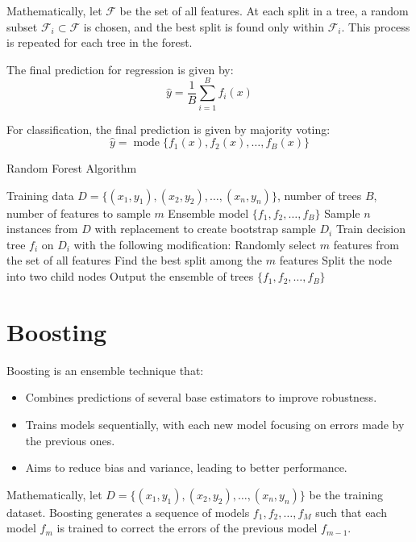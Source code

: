 \documentclass[12pt]{article}
\begin{document}
Mathematically, let \( \mathcal{F} \) be the set of all features. At each split in a tree, a random subset \( \mathcal{F}_i \subset \mathcal{F} \) is chosen, and the best split is found only within \( \mathcal{F}_i \). This process is repeated for each tree in the forest.

The final prediction for regression is given by:
\[
\hat{y} = \frac{1}{B} \sum_{i=1}^{B} f_i(x)
\]

For classification, the final prediction is given by majority voting:
\[
\hat{y} = \operatorname{mode} \{ f_1(x), f_2(x), \ldots, f_B(x) \}
\]

\begin{algorithm}
\caption{Random Forest Algorithm}
\begin{algorithmic}[1]
\REQUIRE Training data \( D = \{(x_1, y_1), (x_2, y_2), \ldots, (x_n, y_n)\} \), number of trees \( B \), number of features to sample \( m \)
\ENSURE Ensemble model \( \{f_1, f_2, \ldots, f_B\} \)
    \STATE Sample \( n \) instances from \( D \) with replacement to create bootstrap sample \( D_i \)
    \STATE Train decision tree \( f_i \) on \( D_i \) with the following modification:
        \STATE Randomly select \( m \) features from the set of all features
        \STATE Find the best split among the \( m \) features
        \STATE Split the node into two child nodes
    \ENDFOR
\ENDFOR
\STATE Output the ensemble of trees \( \{f_1, f_2, \ldots, f_B\} \)
\end{algorithmic}
\end{algorithm}

\section{Boosting}
Boosting is an ensemble technique that:
\begin{itemize}
    \item Combines predictions of several base estimators to improve robustness.
    \item Trains models sequentially, with each new model focusing on errors made by the previous ones.
    \item Aims to reduce bias and variance, leading to better performance.
\end{itemize}

Mathematically, let \( D = \{(x_1, y_1), (x_2, y_2), \ldots, (x_n, y_n)\} \) be the training dataset. Boosting generates a sequence of models \( f_1, f_2, \ldots, f_M \) such that each model \( f_m \) is trained to correct the errors of the previous model \( f_{m-1} \).
\end{document}
